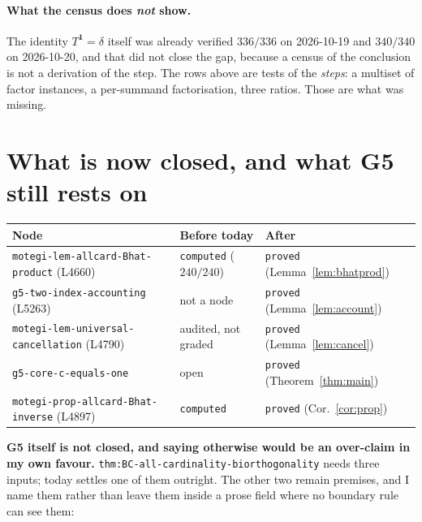 \documentclass[11pt]{article}
\theoremstyle{plain}
\theoremstyle{definition}
\theoremstyle{remark}
\begin{document}
\paragraph{What the census does \emph{not} show.} The identity
$T^{\mathbf 1}=\delta$ itself was already verified $336/336$ on 2026-10-19 and
$340/340$ on 2026-10-20, and that did not close the gap, because a census of the
conclusion is not a derivation of the step. The rows above are tests of the
\emph{steps}: a multiset of factor instances, a per-summand factorisation, three
ratios. Those are what was missing.

\section{What is now closed, and what G5 still rests on}
\label{sec:grade}

\begin{center}
\small
\begin{tabular}{lll}
\hline
\textbf{Node} & \textbf{Before today} & \textbf{After}\\
\hline
\texttt{motegi-lem-allcard-Bhat-product} (L4660) & \texttt{computed} ($240/240$) & \texttt{proved} (Lemma~\ref{lem:bhatprod})\\
\texttt{g5-two-index-accounting} (L5263) & not a node & \texttt{proved} (Lemma~\ref{lem:account})\\
\texttt{motegi-lem-universal-cancellation} (L4790) & audited, not graded & \texttt{proved} (Lemma~\ref{lem:cancel})\\
\texttt{g5-core-c-equals-one} & open & \texttt{proved} (Theorem~\ref{thm:main})\\
\texttt{motegi-prop-allcard-Bhat-inverse} (L4897) & \texttt{computed} & \texttt{proved} (Cor.~\ref{cor:prop})\\
\hline
\end{tabular}
\end{center}

\noindent
\textbf{G5 itself is not closed, and saying otherwise would be an over-claim in my
own favour.} \texttt{thm:BC-all-cardinality-biorthogonality} needs three inputs;
today settles one of them outright. The other two remain premises, and I name them
rather than leave them inside a prose field where no boundary rule can see them:
\end{document}
